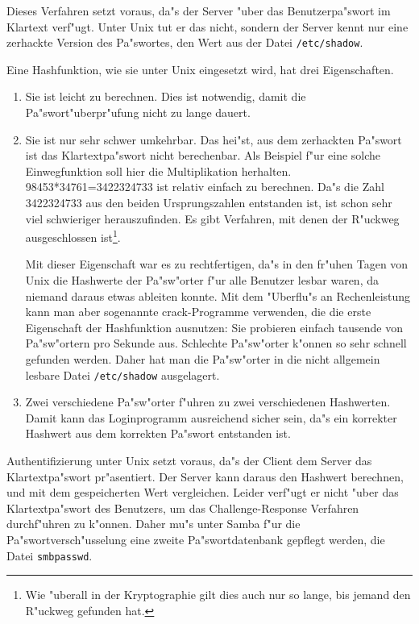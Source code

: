 \documentclass{scrartcl}
\newcommand{\datei}{\texttt}
\begin{document}
Dieses Verfahren setzt voraus, da"s der Server "uber das
Benutzerpa"swort im Klartext verf"ugt. Unter Unix tut er das nicht,
sondern der Server kennt nur eine zerhackte Version des Pa"swortes,
den Wert aus der Datei \datei{/etc/shadow}.

Eine Hashfunktion, wie sie unter Unix eingesetzt wird, hat drei
Eigenschaften.

\begin{enumerate}

\item Sie ist leicht zu berechnen. Dies ist notwendig, damit die
Pa"swort"uberpr"ufung nicht zu lange dauert.

\item Sie ist nur sehr schwer umkehrbar. Das hei"st, aus dem zerhackten 
Pa"swort
ist das Klartextpa"swort nicht berechenbar. Als Beispiel f"ur eine
solche Einwegfunktion soll hier die Multiplikation
herhalten. 98453*34761=3422324733 ist relativ einfach zu
berechnen. Da"s die Zahl 3422324733 aus den beiden Ursprungszahlen
entstanden ist, ist schon sehr viel schwieriger herauszufinden. Es
gibt Verfahren, mit denen der R"uckweg ausgeschlossen ist\footnote{Wie
"uberall in der Kryptographie gilt dies auch nur so lange, bis jemand
den R"uckweg gefunden hat.}.

Mit dieser Eigenschaft war es zu rechtfertigen, da"s in den fr"uhen
Tagen von Unix die Hashwerte der Pa"sw"orter f"ur alle Benutzer lesbar
waren, da niemand daraus etwas ableiten konnte. Mit dem "Uberflu"s an
Rechenleistung kann man aber sogenannte crack-Programme verwenden, die
die erste Eigenschaft der Hashfunktion ausnutzen: Sie probieren
einfach tausende von Pa"sw"ortern pro Sekunde aus. Schlechte
Pa"sw"orter k"onnen so sehr schnell gefunden werden. Daher hat man die
Pa"sw"orter in die nicht allgemein lesbare Datei \datei{/etc/shadow}
ausgelagert.

\item Zwei verschiedene Pa"sw"orter f"uhren zu zwei verschiedenen
Hashwerten. Damit kann das Loginprogramm ausreichend sicher sein, da"s
ein korrekter Hashwert aus dem korrekten Pa"swort entstanden ist.

\end{enumerate}

Authentifizierung unter Unix setzt voraus, da"s der Client dem Server
das Klartextpa"swort pr"asentiert. Der Server kann daraus den Hashwert
berechnen, und mit dem gespeicherten Wert vergleichen. Leider verf"ugt
er nicht "uber das Klartextpa"swort des Benutzers, um das
Challenge-Response Verfahren durchf"uhren zu k"onnen. Daher mu"s unter
Samba f"ur die Pa"swortversch"usselung eine zweite Pa"swortdatenbank
gepflegt werden, die Datei \datei{smbpasswd}.
\end{document}
